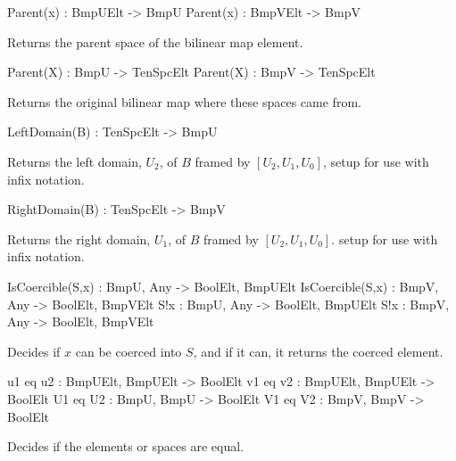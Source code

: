 \begin{intrinsics}
Parent(x) : BmpUElt -> BmpU
Parent(x) : BmpVElt -> BmpV
\end{intrinsics}

Returns the parent space of the bilinear map element.

\begin{intrinsics}
Parent(X) : BmpU -> TenSpcElt
Parent(X) : BmpV -> TenSpcElt
\end{intrinsics}

Returns the original bilinear map where these spaces came from.

\begin{intrinsics}
LeftDomain(B) : TenSpcElt -> BmpU
\end{intrinsics}

Returns the left domain, $U_2$, of $B$ framed by $[U_2,U_1,U_0]$, 
setup for use with infix notation.

\begin{intrinsics}
RightDomain(B) : TenSpcElt -> BmpV
\end{intrinsics}

Returns the right domain, $U_1$, of $B$  framed by $[U_2,U_1,U_0]$. 
setup for use with infix notation.

\begin{intrinsics}
IsCoercible(S,x) : BmpU, Any -> BoolElt, BmpUElt
IsCoercible(S,x) : BmpV, Any -> BoolElt, BmpVElt
S!x : BmpU, Any -> BoolElt, BmpUElt
S!x : BmpV, Any -> BoolElt, BmpVElt
\end{intrinsics}

Decides if $x$ can be coerced into $S$, and if it can, it returns the coerced 
element.

\begin{intrinsics}
u1 eq u2 : BmpUElt, BmpUElt -> BoolElt
v1 eq v2 : BmpUElt, BmpUElt -> BoolElt
U1 eq U2 : BmpU, BmpU -> BoolElt
V1 eq V2 : BmpV, BmpV -> BoolElt
\end{intrinsics}

Decides if the elements or spaces are equal.

